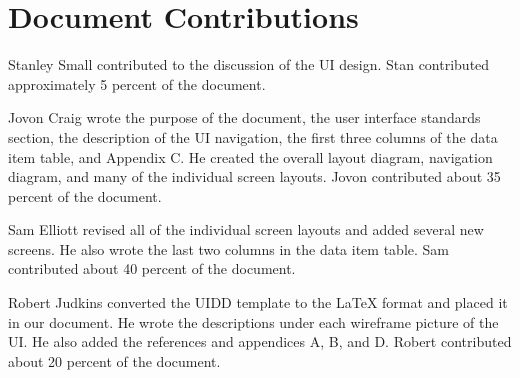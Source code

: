 \documentclass{article}
\begin{document}
\newpage
\section{Document Contributions}

Stanley Small contributed to the discussion of the UI design. Stan contributed approximately 5 percent of the document.

Jovon Craig wrote the purpose of the document, the user interface standards section, the description of the UI navigation, the first three columns of the data item table, and Appendix C. He created the overall layout diagram, navigation diagram, and many of the individual screen layouts. Jovon contributed about 35 percent of the document.

Sam Elliott revised all of the individual screen layouts and added several new screens. He also wrote the last two columns in the data item table. Sam contributed about 40 percent of the document.

Robert Judkins converted the UIDD template to the LaTeX format and placed it in our document. He wrote the descriptions under each wireframe picture of the UI. He also added the references and appendices A, B, and D. Robert contributed about 20 percent of the document.

\newpage




\newpage



\end{document}
